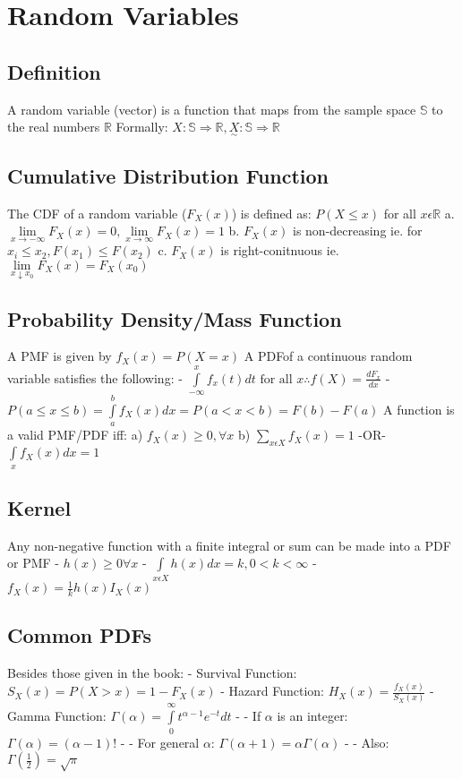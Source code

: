 \documentclass[twocolumn]{article}
\newcommand{\statvec}[1]{\underset{\sim}{#1}} %
\let\Oldint=\int
\let\Oldsum=\sum
\let\Oldlim=\lim
\renewcommand{\int}{\Oldint\limits}
\renewcommand{\sum}{\Oldsum\limits}
\renewcommand{\lim}{\Oldlim\limits}
\begin{document}
\section*{Random Variables}
\subsection*{Definition}
A random variable (vector) is a function that maps from the sample space $\mathbb{S}$ to the real numbers $\mathbb{R}$
Formally: $X: \mathbb{S} \Rightarrow \mathbb{R}, \statvec{X}: \mathbb{S} \Rightarrow \mathbb{R}$

\subsection*{Cumulative Distribution Function}
The CDF of a random variable ($F_X(x)$) is defined as: $P(X \le x)$ for all $x \epsilon \mathbb{R}$
a. $\lim_{x\to-\infty} F_X(x) = 0, \lim_{x\to\infty} F_X(x) = 1$
b. $F_X(x)$ is non-decreasing ie. for $x_i \le x_2, F(x_1) \le F(x_2)$
c. $F_X(x)$ is right-conitnuous ie. $\lim_{x\downarrow x_0} F_X(x) = F_X(x_0)$

\subsection*{Probability Density/Mass Function}
A PMF is given by $f_X(x) = P(X = x)$
A PDFof a continuous random variable satisfies the following:
- $\int_{-\infty}^{x}f_x(t) dt \text{ for all } x \therefore f(X) = \frac{dF_x}{dx}$
- $P(a \le x \le b) = \int_{a}^{b} f_X(x) dx = P(a < x < b) = F(b) - F(a)$ 
A function is a valid PMF/PDF iff:
a) $f_X(x) \ge 0, \forall x$
b) $\sum_{x \epsilon X} f_X(x) = 1$ -OR- $\int_{x} f_X(x)dx = 1$

\subsection*{Kernel}
Any non-negative function with a finite integral or sum can be made into a PDF or PMF
- $h(x) \ge 0 \forall x$
- $\int_{x \epsilon X} h(x)dx = k, 0 < k < \infty$
- $f_X(x) = \frac{1}{k} h(x) I_X(x)$

\subsection*{Common PDFs}
Besides those given in the book:
- Survival Function: $S_X(x) = P(X > x) = 1 - F_X(x)$
- Hazard Function: $H_X(x) = \frac{f_X(x)}{S_X(x)}$
- Gamma Function: $\Gamma(\alpha) = \int_{0}^{\infty} t^{\alpha - 1} e^{-t} dt$
- - If $\alpha$ is an integer: $\Gamma(\alpha) = (\alpha - 1)!$
- - For general $\alpha$: $\Gamma(\alpha + 1) = \alpha \Gamma(\alpha)$
- - Also: $\Gamma(\frac{1}{2}) = \sqrt{\pi}$
\end{document}
